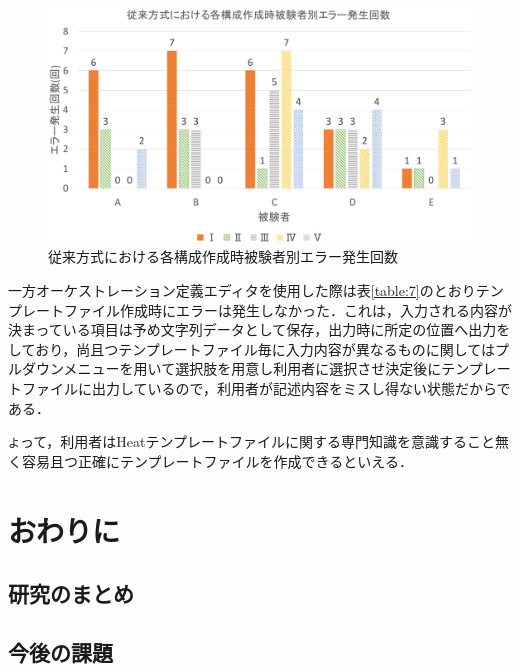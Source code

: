 \documentclass[mingoth]{kut-paper}		%
\begin{document}
\begin{description}
		\begin{figure}[H]
			\begin{center}
				\includegraphics[scale=0.45]{Document/TemplateFile_ErrorGraf.eps}
				\caption{従来方式における各構成作成時被験者別エラー発生回数}
				\label{graf:6}
			\end{center}
		\end{figure}
		
		一方オーケストレーション定義エディタを使用した際は表\ref{table:7}のとおりテンプレートファイル作成時にエラーは発生しなかった．これは，入力される内容が決まっている項目は予め文字列データとして保存，出力時に所定の位置へ出力をしており，尚且つテンプレートファイル毎に入力内容が異なるものに関してはプルダウンメニューを用いて選択肢を用意し利用者に選択させ決定後にテンプレートファイルに出力しているので，利用者が記述内容をミスし得ない状態だからである．
		
		\texttt  よって，利用者はHeatテンプレートファイルに関する専門知識を意識すること無く容易且つ正確にテンプレートファイルを作成できるといえる．
	\end{description}
\chapter{おわりに}
	\section{研究のまとめ}
	\section{今後の課題}
	


\begin{acknowledgement}
%
\end{acknowledgement}
\end{document}
